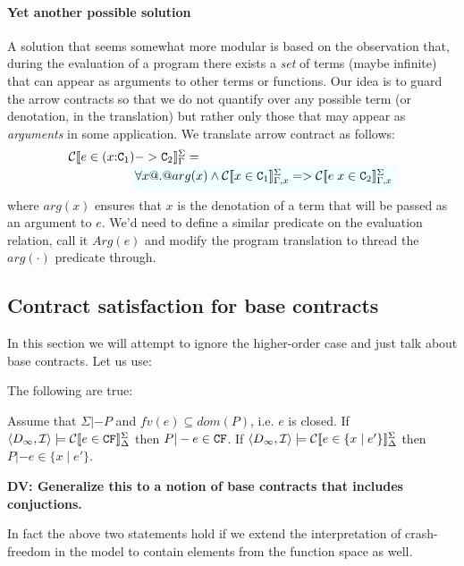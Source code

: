 \documentclass[preprint,nocopyrightspace,draft]{sigplanconf}
\begin{document}
\paragraph{Yet another possible solution}

A solution that seems somewhat more modular is based on the observation that, 
during the evaluation of a program there exists a {\em set} of terms (maybe infinite) that can
appear as arguments to other terms or functions. Our idea is to guard the arrow contracts so that
we do not quantify over any possible term (or denotation, in the translation) but rather only 
those that may appear as {\em arguments} in some application. We translate arrow contract as 
follows:
\[\begin{array}{l}
  \ctrans{\Sigma}{\Gamma}{e \in (x{:}\Ct_1) -> \Ct_2} = \\ 
  \qquad\qquad\quad 
\formula{\forall x @.@ arg(x) \land \ctrans{\Sigma}{\Gamma,x}{x \in \Ct_1} => \ctrans{\Sigma}{\Gamma,x}{e\;x \in \Ct_2}}
\end{array}\] 
where $arg(x)$ ensures that $x$ is the denotation of a term that will be passed as an argument to $e$. We'd need to define
a similar predicate on the evaluation relation, call it $Arg(e)$ and modify the program translation to thread the $arg(\cdot)$
predicate through. 


\subsection{Contract satisfaction for base contracts}\label{sect:cf}

In this section we will attempt to ignore the higher-order case and just talk about 
base contracts. Let us use:

The following are true: 
\begin{lemma}\label{lem:base-contract-adequacy}
Assume that $\Sigma |- P$ and $fv(e) \subseteq dom(P)$, i.e. $e$ is closed.
If $\langle D_\infty,{\cal I}\rangle \models {\cal C}[\![e \in {\tt CF}]\!]_{\Delta}^{\Sigma}$ then $P |- e \in {\tt CF}$. If $\langle D_\infty,{\cal I}\rangle \models {\cal C}[\![e \in \{ x \mid e' \}]\!]_{\Delta}^{\Sigma}$ then $P |- e \in \{x \mid e' \}$.
\end{lemma}
{\bf DV: Generalize this to a notion of base contracts that includes conjuctions.}

In fact the above two statements hold if we extend the interpretation 
of crash-freedom in the model to contain elements from the function 
space as well. 
\end{document}
